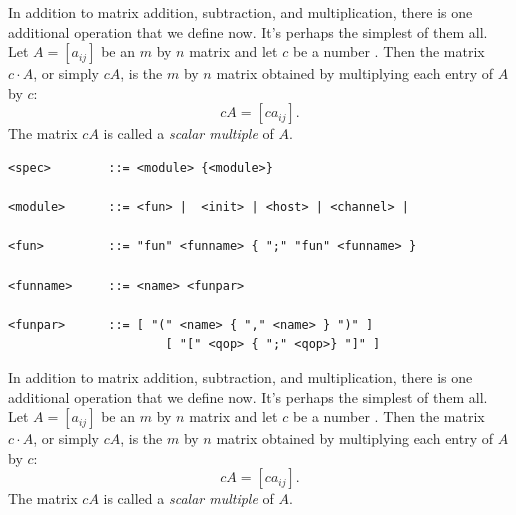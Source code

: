 In addition to matrix addition, subtraction, and multiplication, there is 
one additional operation that we define now. It's perhaps the simplest of 
them all. Let $A=[a_{ij}]$ be an $m$ by $n$ matrix and let $c$ be a 
number \cite{hyvarinen2001ica}. Then the matrix $c\cdot A$, or simply $cA$, is the $m$ by $n$ 
matrix obtained by multiplying each entry of $A$ by $c$:
\[c A=[ca_{ij}].\] 
The matrix $c A$ is called a {\it scalar multiple} of $A$.

\begin{verbatim}
<spec>        ::= <module> {<module>}   

<module>      ::= <fun> |  <init> | <host> | <channel> |

<fun>         ::= "fun" <funname> { ";" "fun" <funname> }

<funname>     ::= <name> <funpar> 

<funpar>      ::= [ "(" <name> { "," <name> } ")" ] 
                      [ "[" <qop> { ";" <qop>} "]" ]
\end{verbatim}

In addition to matrix addition, subtraction, and multiplication, there is 
one additional operation that we define now. It's perhaps the simplest of 
them all. Let $A=[a_{ij}]$ be an $m$ by $n$ matrix and let $c$ be a 
number \cite{hyvarinen2001ica}. Then the matrix $c\cdot A$, or simply $cA$, is the $m$ by $n$ 
matrix obtained by multiplying each entry of $A$ by $c$:
\[c A=[ca_{ij}].\] 
The matrix $c A$ is called a {\it scalar multiple} of $A$.


